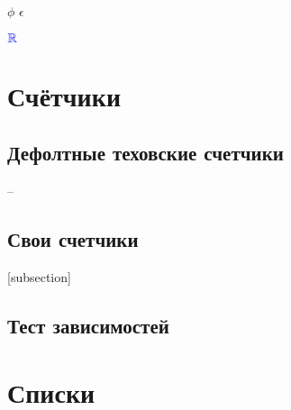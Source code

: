 \documentclass[12pt, a4paper]{article}
\theoremstyle{plain}  %
\theoremstyle{definition} %
\begin{document}
$\phi$ $\epsilon$


\renewcommand{\phi}{{\color{blue} \ensuremath{\mathbb{R}} }} 

$\phi$ 


\section{Счётчики}

\subsection{Дефолтные теховские счетчики}



\thesection -- \thesubsection 

\renewcommand{\thesection}{\Roman{section}}

\renewcommand{\thepage}{\asbuk{page}}

\setcounter{page}{10}

\subsection{Свои счетчики}


[subsection]
\setcounter{jtem}{13} %


\subsection{Тест зависимостей}



\section{Списки}
\end{document}
